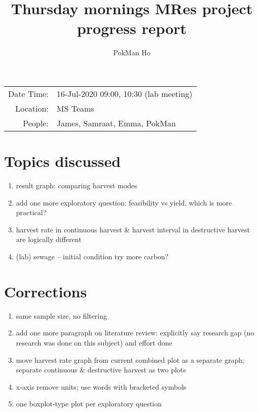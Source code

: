 \documentclass[a4paper,11pt]{article}
\title{Thursday mornings MRes project progress report}
\author{PokMan Ho}
\date{}
\begin{document}
    \maketitle
    
    \begin{tabular}{rl}
        Date Time: & 16-Jul-2020 09:00, 10:30 (lab meeting) \\
        Location: & MS Teams \\
        People: & James, Samraat, Emma, PokMan \\
    \end{tabular}
    
    \section{Topics discussed}
    \begin{enumerate}
        \item result graph: comparing harvest modes
        \item add one more exploratory question: feasibility vs yield, which is more practical?
        \item harvest rate in continuous harvest \& harvest interval in destructive harvest are logically different
        \item (lab) sewage -- initial condition try more carbon?
    \end{enumerate}
    
    \section{Corrections}
    \begin{enumerate}
        \item same sample size, no filtering
        \item add one more paragraph on literature review: explicitly say research gap (no research was done on this subject) and effort done
        \item move harvest rate graph from current combined plot as a separate graph; separate continuous \& destructive harvest as two plots
        \item x-axis remove units; use words with bracketed symbols
        \item one boxplot-type plot per exploratory question
    \end{enumerate}
    
\end{document}
